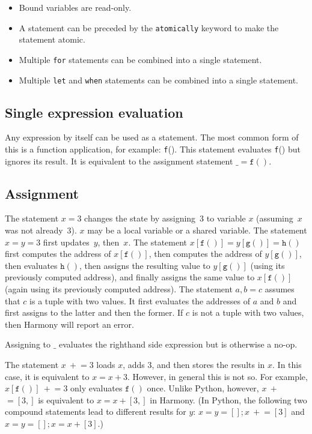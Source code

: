 \documentclass{report}
\begin{document}
\begin{itemize}
\item Bound variables are read-only.
\item A statement can be preceded by the \texttt{atomically} keyword to make
the statement atomic.
\item Multiple \texttt{for} statements can be combined into a single statement.
\item Multiple \texttt{let} and \texttt{when} statements can be combined into
a single statement.
\end{itemize}

\subsection*{Single expression evaluation}

Any expression by itself can be used as a statement.  The most common
form of this is a function application, for example: \texttt{f}().
This statement evaluates \texttt{f}() but ignores its result.
It is equivalent to the assignment statement $\_ = \mathtt{f}()$.

\subsection*{Assignment}

The statement $x = 3$ changes the state by assigning~3 to
variable $x$ (assuming~$x$ was not already~3).
$x$ may be a local variable or a shared variable.
The statement $x = y = 3$ first updates~$y$, then~$x$.
The statement $x[\mathtt{f}()] = y[\mathtt{g}()] = \mathtt{h}()$ first computes
the address of $x[\mathtt{f}()]$, then computes the address of
$y[\mathtt{g}()]$, then evaluates $\mathtt{h}()$, then assigns the resulting value to $y[\mathtt{g}()]$ (using its previously computed address), and finally assigns the same value to $x[\mathtt{f}()]$ (again using its previously computed address).
The statement $a,b = c$ assumes that $c$ is a tuple with two values.
It first evaluates the addresses of $a$ and $b$ and first assigns to
the latter and then the former.
If $c$ is not a tuple with two values, then Harmony will report an error.

Assigning to $\_$ evaluates the righthand side expression but is otherwise
a no-op.

The statement $x~+$$= 3$ loads $x$, adds 3, and then stores the
results in $x$.  In this case, it is equivalent to $x = x + 3$.
However, in general this is not so.  For example, $x[\mathtt{f}()]~+$$= 3$
only evaluates $\mathtt{f}()$ once.  Unlike Python, however,
$x~+$$= [3,]$ is equivalent to $x = x + [3,]$ in Harmony.
(In Python, the following two compound statements lead to different results
for $y$: $x = y = []; x~+$$= [3]$ and $x = y = []; x = x + [3]$.)
\end{document}
